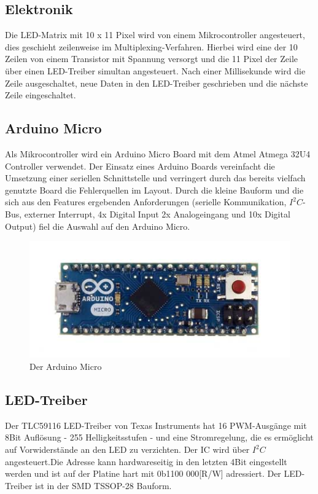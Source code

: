 \begin{multicols}{2}
\section{Elektronik}
\label{sec:Elektronik}
Die LED-Matrix mit 10 x 11 Pixel wird von einem Mikrocontroller angesteuert, dies geschieht zeilenweise im Multiplexing-Verfahren. Hierbei wird eine der 10  Zeilen von einem Transistor mit Spannung versorgt und die 11 Pixel der Zeile über einen LED-Treiber simultan angesteuert. Nach einer Millisekunde wird die Zeile ausgeschaltet, neue Daten in den LED-Treiber geschrieben und die nächste Zeile eingeschaltet. 
\subsection{Arduino Micro}
Als Mikrocontroller wird ein Arduino Micro Board mit dem Atmel Atmega 32U4 Controller verwendet. Der Einsatz eines Arduino Boards vereinfacht die Umsetzung einer seriellen Schnittstelle und verringert durch das bereits vielfach genutzte Board die Fehlerquellen im Layout. Durch die kleine Bauform und die sich aus den Features ergebenden Anforderungen (serielle Kommunikation, $I^{2}C$-Bus, externer Interrupt, 4x Digital Input 2x Analogeingang und 10x Digital Output) fiel die Auswahl auf den Arduino Micro.
\begin{figure}[h]
    \centering
    \includegraphics[width=\columnwidth]{Abbildungen/ArduinoMicro}
    \caption[Arduino Micro]{Der Arduino Micro}
    \label{fig:ArduinoMicro}
\end{figure}
\subsection{LED-Treiber}
Der TLC59116 LED-Treiber von Texas Instruments hat 16 PWM-Ausgänge mit 8Bit Auflösung - 255 Helligkeitsstufen - und eine Stromregelung, die es ermöglicht auf Vorwiderstände an den LED zu verzichten. Der IC wird über $I^{2}C$ angesteuert.Die Adresse kann hardwareseitig in den letzten 4Bit eingestellt werden und ist auf der Platine hart mit 0b1100 000[R/W] adressiert. Der LED-Treiber ist in der SMD TSSOP-28 Bauform.

\end{multicols}
